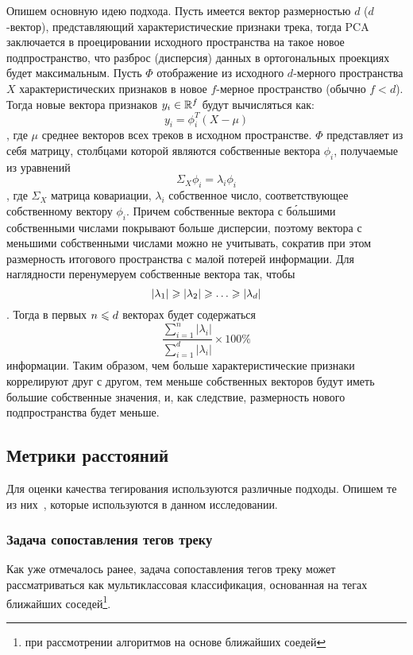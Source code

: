 Опишем основную идею подхода. Пусть имеется вектор размерностью $d$ ($d$-вектор), представляющий характеристические признаки трека, тогда PCA заключается в проецировании исходного пространства
на такое новое подпространство, что разброс (дисперсия) данных в ортогональных проекциях будет максимальным. Пусть $\Phi$ \ld отображение из исходного $d$-мерного пространства $X$ характеристических
признаков в новое $f$-мерное пространство (обычно $f < d$). Тогда новые вектора признаков $y_i \in \mathbb{R}^f$ будут вычисляться как:
$$ y_i = \phi_i^T(X - \mu) $$,
где $\mu$ \ld среднее векторов всех треков в исходном пространстве. $\Phi$ представляет из себя матрицу, столбцами которой являются собственные вектора $\phi_i$, получаемые из уравнений
$$\Sigma_X \phi_i = \lambda_i\phi_i $$,
где $\Sigma_X$ \ld матрица ковариации, $\lambda_i$ \ld собственное число, соответствующее собственному вектору $\phi_i$. Причем собственные вектора с б\'{о}льшими собственными числами покрывают
больше дисперсии, поэтому вектора с меньшими собственными числами можно не учитывать, сократив при этом размерность итогового пространства с малой потерей информации. Для наглядности 
перенумеруем собственные вектора так, чтобы
$$|\lambda_1| \geqslant |\lambda_2| \geqslant \ldots \geqslant |\lambda_d|$$.
Тогда в первых $n \leqslant d$ векторах будет содержаться 
$$\frac{\sum_{i=1}^{n} |\lambda_i|}{\sum_{i=1}^{d} |\lambda_i|} \times 100\%$$ 
информации. Таким образом, чем больше характеристические признаки коррелируют друг с другом, тем меньше собственных векторов будут иметь большие собственные значения, и, как следствие, размерность нового подпространства
будет меньше.

\subsection{Метрики расстояний}

Для оценки качества тегирования используются различные подходы. Опишем те из них~\cite{msordo_thesis, prec_recall}, которые используются в данном исследовании.

\subsubsection{Задача сопоставления тегов треку}

Как уже отмечалось ранее, задача сопоставления тегов треку может рассматриваться как мультиклассовая классификация, 
основанная на тегах ближайших соседей\footnote{при рассмотрении алгоритмов на основе ближайших соедей}.

